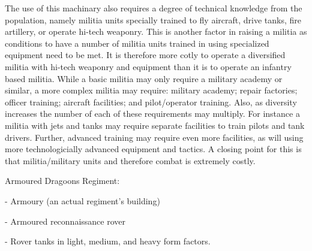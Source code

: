 The use of this machinary also requires a degree of technical knowledge from the population, namely militia units specially trained to fly aircraft, drive tanks, fire artillery, or operate hi-tech weaponry. This is another factor in raising a militia as conditions to have a number of militia units trained in using specialized equipment need to be met. It is therefore more cotly to operate a diversified militia with hi-tech weaponry and equipment than it is to operate an infantry based militia. While a basic militia may only require a military academy or similar, a more complex militia may require: military academy; repair factories; officer training; aircraft facilities; and pilot/operator training. Also, as diversity increases the number of each of these requirements may multiply. For instance a militia with jets and tanks may require separate facilities to train pilots and tank drivers. Further, advanced training may require even more facilities, as will using more technologicially advanced equipment and tactics. A closing point for this is that militia/military units and therefore combat is extremely costly.  







Armoured Dragoons Regiment:

- Armoury (an actual regiment's building)

- Armoured reconnaissance rover

- Rover tanks in light, medium, and heavy form factors.

